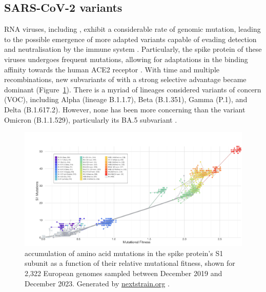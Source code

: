 \subsection{SARS-CoV-2 variants}

RNA viruses, including \sars, exhibit a considerable rate of genomic mutation, leading to the possible emergence of more adapted variants capable of evading detection and neutralisation by the immune system \citep{markov2023EvolutionSARSCoV2}.
Particularly, the spike protein of these viruses undergoes frequent mutations, allowing for adaptations in the binding affinity towards the human ACE2 receptor \citep{singh2021OriginEvolution}.
With time and multiple recombinations, new subvariants of \covid with a strong selective advantage became dominant (Figure~\ref{fig:sars-mutations}).
There is a myriad of \sars lineages considered variants of concern (VOC), including Alpha (lineage B.1.1.7), Beta (B.1.351), Gamma (P.1), and Delta (B.1.617.2).
However, none has been more concerning than the variant Omicron (B.1.1.529), particularly its BA.5 subvariant \citep{cao2022BA12}.


\begin{figure}[h]
    \centering
    \includegraphics[width=\textwidth]{chapter/introduction/figures/nextstrain_ncov_gisaid_europe_all-time.png}
    \caption[\sars accumulation of amino acid mutations in the spike protein's S1 subunit as a function of their relative mutational fitness]{\sars accumulation of amino acid mutations in the spike protein's S1 subunit as a function of their relative mutational fitness, shown for 2,322 European genomes sampled between December 2019 and December 2023. Generated by \href{https://nextstrain.org/}{nextstrain.org} \citep{hadfield2018NextstrainRealtime}.}
    \label{fig:sars-mutations}
\end{figure}


